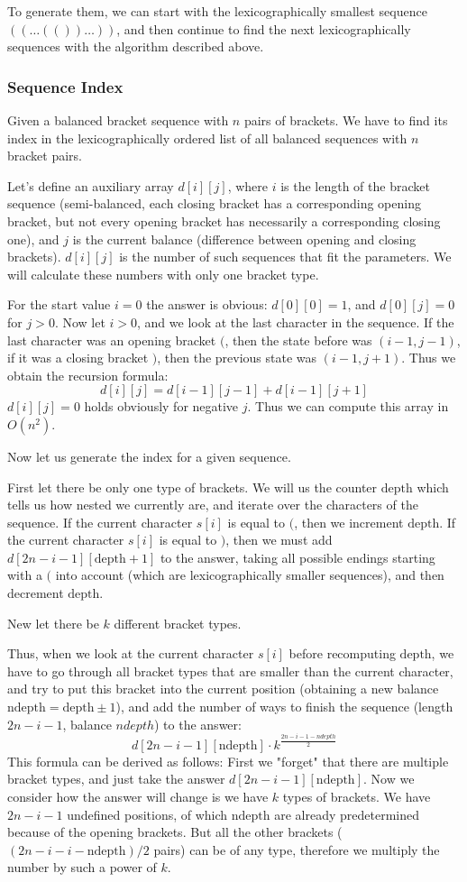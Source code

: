 \documentclass[8pt, a4paper, oneside, twocolumn]{extarticle}
\begin{document}
To generate them, we can start with the lexicographically smallest sequence $((\dots(())\dots))$, and then continue to find the next lexicographically sequences with the algorithm described above. 
\subsubsection{Sequence Index}
Given a balanced bracket sequence with $n$ pairs of brackets. We have to find its index in the lexicographically ordered list of all balanced sequences with $n$ bracket pairs.

Let's define an auxiliary array $d[i][j]$, where $i$ is the length of the bracket sequence (semi-balanced, each closing bracket has a corresponding opening bracket, but not every opening bracket has necessarily a corresponding closing one), and $j$ is the current balance (difference between opening and closing brackets). $d[i][j]$ is the number of such sequences that fit the parameters. We will calculate these numbers with only one bracket type.

For the start value $i = 0$ the answer is obvious: $d[0][0] = 1$, and $d[0][j] = 0$ for $j > 0$. Now let $i > 0$, and we look at the last character in the sequence. If the last character was an opening bracket $($, then the state before was $(i-1, j-1)$, if it was a closing bracket $)$, then the previous state was $(i-1, j+1)$. Thus we obtain the recursion formula: $$d[i][j] = d[i-1][j-1] + d[i-1][j+1]$$ $d[i][j] = 0$ holds obviously for negative $j$. Thus we can compute this array in $O(n^2)$.

Now let us generate the index for a given sequence.

First let there be only one type of brackets. We will us the counter $\text{depth}$ which tells us how nested we currently are, and iterate over the characters of the sequence. If the current character $s[i]$ is equal to $($, then we increment $\text{depth}$. If the current character $s[i]$ is equal to $)$, then we must add $d[2n-i-1][\text{depth}+1]$ to the answer, taking all possible endings starting with a $($ into account (which are lexicographically smaller sequences), and then decrement $\text{depth}$.

New let there be $k$ different bracket types.

Thus, when we look at the current character $s[i]$ before recomputing $\text{depth}$, we have to go through all bracket types that are smaller than the current character, and try to put this bracket into the current position (obtaining a new balance $\text{ndepth} = \text{depth} \pm 1$), and add the number of ways to finish the sequence (length $2n-i-1$, balance $ndepth$) to the answer: $$d[2n - i - 1][\text{ndepth}] \cdot k^{\frac{2n - i - 1 - ndepth}{2}}$$ This formula can be derived as follows: First we "forget" that there are multiple bracket types, and just take the answer $d[2n - i - 1][\text{ndepth}]$. Now we consider how the answer will change is we have $k$ types of brackets. We have $2n - i - 1$ undefined positions, of which $\text{ndepth}$ are already predetermined because of the opening brackets. But all the other brackets ($(2n - i - i - \text{ndepth})/2$ pairs) can be of any type, therefore we multiply the number by such a power of $k$.
\end{document}
